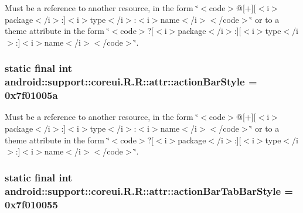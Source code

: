 Must be a reference to another resource, in the form \char`\"{}$<$code$>$@\mbox{[}+\mbox{]}\mbox{[}$<$i$>$package$<$/i$>$:\mbox{]}$<$i$>$type$<$/i$>$:$<$i$>$name$<$/i$>$$<$/code$>$\char`\"{} or to a theme attribute in the form \char`\"{}$<$code$>$?\mbox{[}$<$i$>$package$<$/i$>$:\mbox{]}\mbox{[}$<$i$>$type$<$/i$>$:\mbox{]}$<$i$>$name$<$/i$>$$<$/code$>$\char`\"{}. \hypertarget{classandroid_1_1support_1_1coreui_1_1_r_1_1attr_dbd9109618fefb13d89324f0de443b84}{
\subsubsection[{actionBarStyle}]{\setlength{\rightskip}{0pt plus 5cm}static final int android::support::coreui.R.R::attr::actionBarStyle = 0x7f01005a}}
\label{classandroid_1_1support_1_1coreui_1_1_r_1_1attr_dbd9109618fefb13d89324f0de443b84}


Must be a reference to another resource, in the form \char`\"{}$<$code$>$@\mbox{[}+\mbox{]}\mbox{[}$<$i$>$package$<$/i$>$:\mbox{]}$<$i$>$type$<$/i$>$:$<$i$>$name$<$/i$>$$<$/code$>$\char`\"{} or to a theme attribute in the form \char`\"{}$<$code$>$?\mbox{[}$<$i$>$package$<$/i$>$:\mbox{]}\mbox{[}$<$i$>$type$<$/i$>$:\mbox{]}$<$i$>$name$<$/i$>$$<$/code$>$\char`\"{}. \hypertarget{classandroid_1_1support_1_1coreui_1_1_r_1_1attr_c89ed89494510d634b1ec32322684175}{
\subsubsection[{actionBarTabBarStyle}]{\setlength{\rightskip}{0pt plus 5cm}static final int android::support::coreui.R.R::attr::actionBarTabBarStyle = 0x7f010055}}
\label{classandroid_1_1support_1_1coreui_1_1_r_1_1attr_c89ed89494510d634b1ec32322684175}


